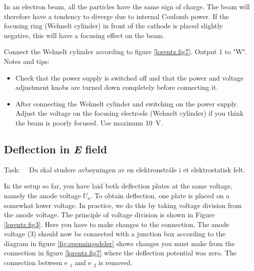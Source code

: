 \documentclass[../Elmag-labhefte-2020.tex]{subfiles}
\begin{document}
In an electron beam, all the particles have the same sign of charge. The beam will therefore have a tendency to diverge due to internal Coulomb power. If the focusing ring (Wehnelt cylinder) in front of the cathode is placed slightly negative, this will have a focusing effect on the beam.

{\itsf Connect the Wehnelt cylinder according to figure \ref{lorentz.fig7}.}
Output 1 to "W".
Notes and tips:
\vspace{-4mm}
\begin{itemize}
    \item Check that the power supply is switched off and that the power and voltage adjustment knobs are turned down completely before connecting it.
    \item After connecting the Wehnelt cylinder and switching on the power supply. Adjust the voltage on the focusing electrode (Wehnelt cylinder) if you think the beam is poorly focused. Use maximum \SI{10}{\volt}.
\end{itemize}
\newpage

\subsection{Deflection in \textsl{E} field}

Task: \ \
{\itsf Du skal studere avbøyningen av en elektronstråle i et elektrostatisk felt.}

In the setup so far, you have laid both deflection plates at the same voltage, namely the anode voltage $U_\mathrm{a}$. To obtain deflection, one plate is placed on a somewhat lower voltage. In practice, we do this by taking voltage division from the anode voltage. The principle of voltage division is shown in Figure \ref{lorentz.fig3}. Here you have to make changes to the connection. The anode voltage (3) should now be connected with a junction box according to the diagram in figure \ref{fig:spenningsdeler} shows changes you must make from the connection in figure \ref{lorentz.fig7} where the deflection potential was zero. The connection between e $_1$ and e $_2$ is removed.
\end{document}
